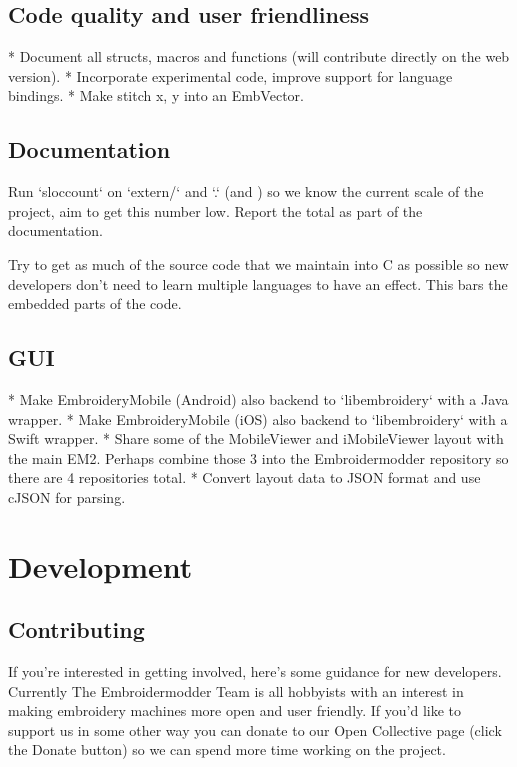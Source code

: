 \documentclass[11pt]{report}
\begin{document}
\subsection{Code quality and user friendliness}

* Document all structs, macros and functions (will contribute directly
  on the web version).
* Incorporate experimental code, improve support for language bindings.
* Make stitch x, y into an EmbVector.

\subsection{Documentation}

Run `sloccount` on `extern/` and `.` (and ) so we know the
current scale of the project, aim to get this number low. Report the total as
part of the documentation.

Try to get as much of the source code that we maintain into C as possible so
new developers don't need to learn multiple languages to have an effect. This
bars the embedded parts of the code.

\subsection{GUI}

* Make EmbroideryMobile (Android) also backend to `libembroidery` with a Java wrapper.
* Make EmbroideryMobile (iOS) also backend to `libembroidery` with a Swift wrapper.
* Share some of the MobileViewer and iMobileViewer layout with the main EM2. Perhaps combine those 3 into the Embroidermodder repository so there are 4 repositories total.
* Convert layout data to JSON format and use cJSON for parsing.

\section{Development}

\subsection{Contributing}

If you're interested in getting involved, here's some guidance
for new developers. Currently The Embroidermodder Team is all
hobbyists with an interest in making embroidery machines more
open and user friendly. If you'd like to support us in some other way
you can donate to our Open Collective page (click the Donate button) so
we can spend more time working on the project.
\end{document}
